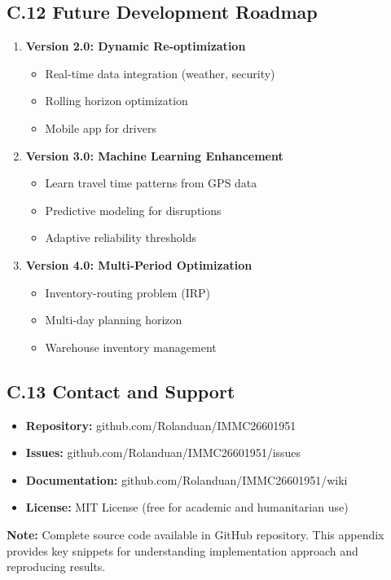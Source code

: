 \subsection{C.12 Future Development Roadmap}

\begin{enumerate}
\item \textbf{Version 2.0: Dynamic Re-optimization}
\begin{itemize}
\item Real-time data integration (weather, security)
\item Rolling horizon optimization
\item Mobile app for drivers
\end{itemize}

\item \textbf{Version 3.0: Machine Learning Enhancement}
\begin{itemize}
\item Learn travel time patterns from GPS data
\item Predictive modeling for disruptions
\item Adaptive reliability thresholds
\end{itemize}

\item \textbf{Version 4.0: Multi-Period Optimization}
\begin{itemize}
\item Inventory-routing problem (IRP)
\item Multi-day planning horizon
\item Warehouse inventory management
\end{itemize}
\end{enumerate}

\subsection{C.13 Contact and Support}

\begin{itemize}
\item \textbf{Repository:} github.com/Rolanduan/IMMC26601951
\item \textbf{Issues:} github.com/Rolanduan/IMMC26601951/issues
\item \textbf{Documentation:} github.com/Rolanduan/IMMC26601951/wiki
\item \textbf{License:} MIT License (free for academic and humanitarian use)
\end{itemize}

\textbf{Note:} Complete source code available in GitHub repository. This appendix provides key snippets for understanding implementation approach and reproducing results.
